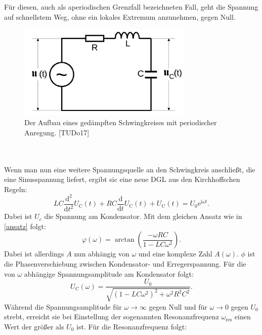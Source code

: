 \documentclass[
  bibliography=totoc,     %
  captions=tableheading,  %
  titlepage=firstiscover, %
]{scrartcl}
\begin{document}
Für diesen, auch als aperiodischen Grenzfall bezeichneten Fall, geht die Spannung
auf schnellstem Weg, ohne ein lokales Extremum anzunehmen, gegen Null.
\begin{figure}[htb]
  \centering
  \includegraphics[width=0.75\textwidth]{V3542.png}
  \caption{Der Aufbau eines gedämpften Schwingkreises mit periodischer Anregung. [TUDo17]}
  \label{V3542}
\end{figure}
\\
\\
Wenn man nun eine weitere Spannungsquelle an den Schwingkreis anschließt, die
eine Sinusspannung liefert, ergibt sic eine neue DGL aus den Kirchhoffschen Regeln:
\begin{equation}
    LC\frac{\mathup{d}^2}{\mathup{d}t^2}U_{\mathup{C}}(t)+RC\frac{\mathup{d}}{\mathup{d}t}U_{\mathup{C}}(t)+U_{\mathup{C}}(t)=U_0\mathup{e}^{\mathup{i}\omega t}.
    \label{dgl2}
\end{equation}
Dabei ist $U_c$ die Spannung am Kondensator. Mit dem gleichen Ansatz wie in
\ref{ansatz} folgt:
\begin{equation}
    \varphi(\omega)=\arctan\left(\frac{-\omega RC}{1-LC\omega^2}\right).
    \label{eq:phase}
\end{equation}
Dabei ist allerdings $A$ nun abhängig von $\omega$ und eine komplexe Zahl $A(\omega)$.
$\phi$ ist die Phasenverschiebung zwischen Kondensator- und Erregerspannung.
Für die von $\omega$ abhängige Spannungsamplitude am Kondensator folgt:
\begin{equation}
    U_{\mathup{C}}(\omega)=\frac{U_0}{\sqrt{\left(1-LC\omega^2\right)^2+\omega^2R^2C^2}}.
    \label{eq:amplitude}
\end{equation}
Während die Spannungsamplitude für $\omega\rightarrow\infty$ gegen Null und für
$\omega\rightarrow 0$ gegen $U_0$ strebt, erreicht sie bei Einstellung der
sogenannten Resonanzfrequenz $\omega_{\mathup{res}}$ einen Wert der größer als
$U_0$ ist. Für die Resonanzfrequenz folgt:
\end{document}
